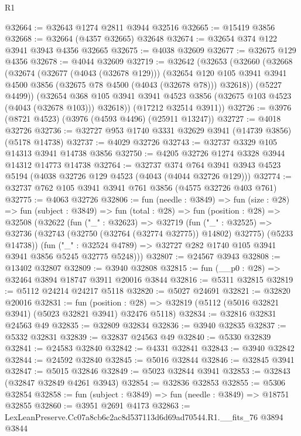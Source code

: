 \begin{lexlean}{R1}
\begin{coremodule}
@32664 := @32643 @1274 @2811 @3944 @32516
@32665 := @15419 @3856
@32668 := @32664 (@4357 @32665) @32648
@32674 := @32654 @374 @122 @3941 @3943 @4356 @32665
@32675 := @4038 @32609
@32677 := @32675 @129 @4356
@32678 := @4044 @32609
@32719 := @32642
    (@32653
      (@32660
        (@32668
          (@32674
            (@32677 (@4043 (@32678 @129)))
            (@32654
              @120
              @105
              @3941
              @3941
              @4500
              @3856
              (@32675 @78 @4500 (@4043 (@32678 @78)))
              @32618))
          (@5227 @4499))
        (@32654 @368 @105 @3941 @3941 @4523 @3856 (@32675 @103 @4523 (@4043 (@32678 @103))) @32618))
      (@17212 @32514 @3911))
@32726 := @3976 (@8721 @4523) (@3976 (@4593 @4496) (@25911 @13247))
@32727 := @4018 @32726
@32736 := @32727 @953 @1740 @3331 @32629 @3941 (@14739 @3856) (@5178 @14738)
@32737 := @4029 @32726
@32743 := @32737 @3329 @105 @14313 @3941 @14738 @3856
@32750 := @4205 @32726 @1274 @3328 @3944 @14312 @14773 @14738
@32764 := @32737
    @374
    @764
    @3941
    @3943
    @4523
    @5194
    (@4038 @32726 @129 @4523 (@4043 (@4044 @32726 @129)))
@32774 := @32737 @762 @105 @3941 @3941 @761 @3856 (@4575 @32726 @403 @761)
@32775 := @4063 @32726
@32806 := fun (needle : @3849) =>
  fun (size : @28) =>
  fun (subject : @3849) =>
  fun (total : @28) =>
  fun (position : @28) =>
  @32508
    (@32622
      (fun ("_" : @32623) =>
      @32719
        (fun ("_" : @32525) =>
        @32736 (@32743 (@32750 (@32764 (@32774 @32775)) @14802) @32775) (@5233 @14738))
        (fun ("_" : @32524 @4789) => @32727 @282 @1740 @105 @3941 @3941 @3856 @5245 @32775 @5248)))
@32807 := @24567 @3943
@32808 := @13402 @32807
@32809 := @3940 @32808
@32815 := fun (__p0 : @28) => @32464 @3894 @18747 @3911 @20016 @3844
@32816 := @5311 @32815
@32819 := @5112 @24214 @24217 @5118
@32820 := @5027 @24691
@32821 := @32820 @20016
@32831 := fun (position : @28) =>
  @32819 (@5112 (@5016 @32821 @3941) (@5023 @32821 @3941) @32476 @5118)
@32834 := @32816 @32831 @24563 @49
@32835 := @32809 @32834
@32836 := @3940 @32835
@32837 := @5332 @32831
@32839 := @32837 @24563 @49
@32840 := @5330 @32839
@32841 := @24583 @32840
@32842 := @4331 @32841
@32843 := @3940 @32842
@32844 := @24592 @32840
@32845 := @5016 @32844
@32846 := @32845 @3941
@32847 := @5015 @32846
@32849 := @5023 @32844 @3941
@32853 := @32843 (@32847 @32849 @4261 @3943)
@32854 := @32836 @32853
@32855 := @5306 @32854
@32858 := fun (subject : @3849) => fun (needle : @3849) => @18751 @32855
@32860 := @3951 @2691 @4173
@32863 := LexLeanPreserve.Cc07a8cb6c2ac8d537113d6d69ad70544.R1.__fits_76 @3894 @3844

\end{coremodule}
\end{lexlean}
